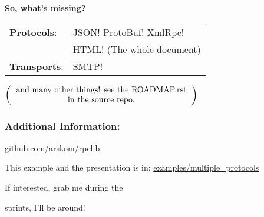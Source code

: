 \documentclass{beamer}
\begin{document}
\begin{frame}
  \huge
  \textbf{So, what's missing?}
  \begin{center}
\Large
  \begin{tabular}{ll}
    \textbf{Protocols}:  & JSON! ProtoBuf! XmlRpc! \\
                         & HTML! (The whole document) \\
    \textbf{Transports}: & SMTP!
  \end{tabular}

  \bigskip

  \large
  $\left(
    \begin{tabular}{c}
    and many other things! see the ROADMAP.rst \\
    in the source repo.
  \end{tabular}
  \right)$

  \end{center}
\end{frame}

\begin{frame}
  \frametitle{Additional Information:}

  \begin{center}
  \huge

  \href{http://github.com/arskom/rpclib}{github.com/arskom/rpclib}

  \bigskip

  \large

  This example and the presentation is in: \href{https://github.com/arskom/rpclib/tree/master/examples/multiple_protocols}{examples/multiple\_protocols}

  \bigskip

  \huge

  If interested, grab me during the

  \bigskip

  sprints, I'll be around!

  \end{center}

\end{frame}
\end{document}
